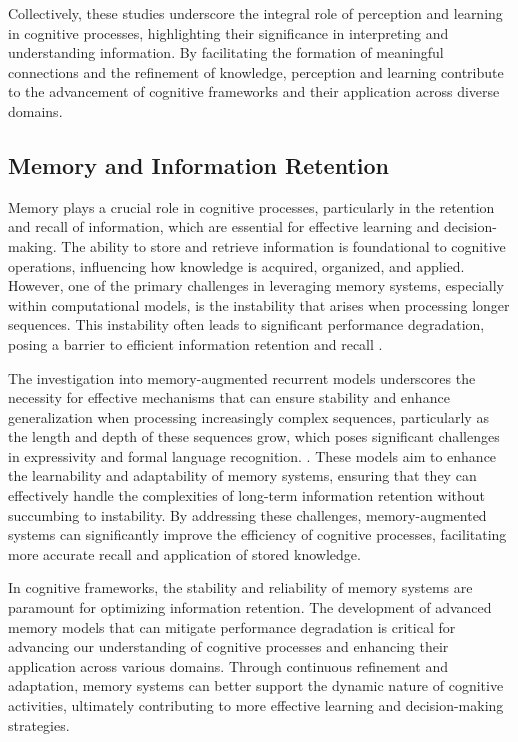 Collectively, these studies underscore the integral role of perception and learning in cognitive processes, highlighting their significance in interpreting and understanding information. By facilitating the formation of meaningful connections and the refinement of knowledge, perception and learning contribute to the advancement of cognitive frameworks and their application across diverse domains.


\subsection{Memory and Information Retention} \label{subsec:Memory and Information Retention}



Memory plays a crucial role in cognitive processes, particularly in the retention and recall of information, which are essential for effective learning and decision-making. The ability to store and retrieve information is foundational to cognitive operations, influencing how knowledge is acquired, organized, and applied. However, one of the primary challenges in leveraging memory systems, especially within computational models, is the instability that arises when processing longer sequences. This instability often leads to significant performance degradation, posing a barrier to efficient information retention and recall \cite{das2024exploringlearnabilitymemoryaugmentedrecurrent}.



The investigation into memory-augmented recurrent models underscores the necessity for effective mechanisms that can ensure stability and enhance generalization when processing increasingly complex sequences, particularly as the length and depth of these sequences grow, which poses significant challenges in expressivity and formal language recognition. \cite{das2024exploringlearnabilitymemoryaugmentedrecurrent}. These models aim to enhance the learnability and adaptability of memory systems, ensuring that they can effectively handle the complexities of long-term information retention without succumbing to instability. By addressing these challenges, memory-augmented systems can significantly improve the efficiency of cognitive processes, facilitating more accurate recall and application of stored knowledge.



In cognitive frameworks, the stability and reliability of memory systems are paramount for optimizing information retention. The development of advanced memory models that can mitigate performance degradation is critical for advancing our understanding of cognitive processes and enhancing their application across various domains. Through continuous refinement and adaptation, memory systems can better support the dynamic nature of cognitive activities, ultimately contributing to more effective learning and decision-making strategies.



